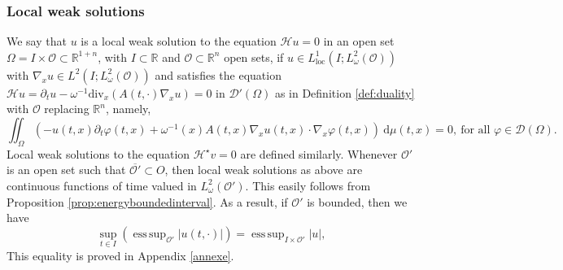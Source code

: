 \documentclass[12pt, letterpaper]{amsart}
\theoremstyle{definition}
\theoremstyle{remark}
\numberwithin{equation}{section}
\DeclareMathOperator*{\supess}{ess\,sup}
\begin{document}
\subsubsection{Local weak solutions}
We say that $u$ is a local weak solution to the equation $\mathcal{H}u=0$ in an open set $\Omega=I \times \mathcal{O} \subset \mathbb{R}^{1+n}$, with $I \subset \mathbb{R}$ and $\mathcal{O} \subset \mathbb{R}^n$ open sets, if $u \in L^1_{\mathrm{loc}}(I; L^2_\omega(\mathcal{O})) $ with $\nabla_x u \in L^2(I; L^2_\omega(\mathcal{O}))$ and satisfies the equation $\mathcal{H}u=\partial_tu-\omega^{-1} \mathrm{div}_x( A(t,\cdot)\nabla_xu)=0$ in $\mathcal{D'}(\Omega)$ as in Definition \ref{def:duality} with $\mathcal{O}$ replacing $\mathbb{R}^n$, namely,
$$\iint_{\Omega} \left ( -u(t,x)  \partial_t \varphi(t,x) +\omega^{-1}(x) A(t,x)\nabla_x u(t,x) \cdot \nabla_x \varphi(t,x)  \right ) \ \mathrm{d}\mu(t,x) =0, \ \text{for all $\varphi \in  \mathcal{D}(\Omega)$}.$$
Local weak solutions to the equation $\mathcal{H}^\star v=0$ are defined similarly.
Whenever $\mathcal{O'}$ is an open set such that $\overline{\mathcal{O'}}\subset O $, then local weak solutions as above are continuous functions of time valued in $L^2_\omega(\mathcal{O'})$. This easily follows from Proposition \ref{prop:energyboundedinterval}. As a result, if $\mathcal{O'}$ is bounded, then we have
\begin{equation}\label{sup pour sol faibles}
        \sup_{t \in I} \left ( \supess_{\mathcal{O'}} \left | u(t,\cdot) \right | \right ) = \supess_{I \times \mathcal{O'}} \left | u \right |,
\end{equation}
This equality is proved in Appendix \ref{annexe}.
\end{document}

